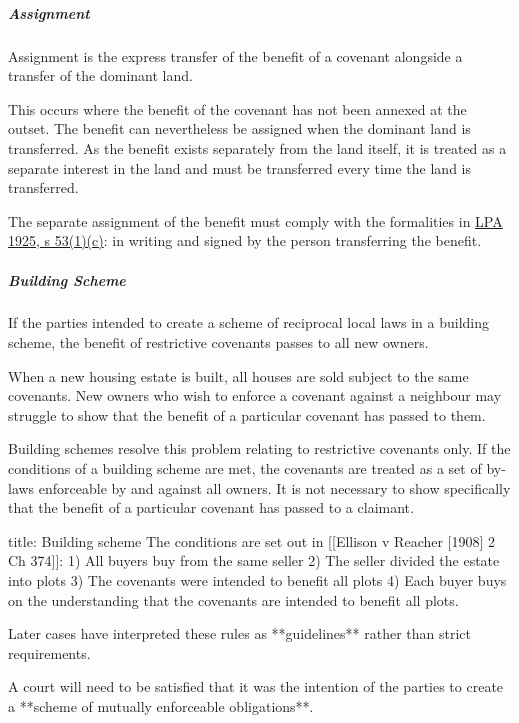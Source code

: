 \documentclass[
]{article}
\newenvironment{Shaded}{}{}
\newcommand{\NormalTok}[1]{#1}
\begin{document}
\hypertarget{assignment}{%
\subparagraph{Assignment}\label{assignment}}

\begin{Shaded}
\begin{Highlighting}[]
\NormalTok{Assignment is the express transfer of the benefit of a covenant alongside a transfer of the dominant land.}
\end{Highlighting}
\end{Shaded}

This occurs where the benefit of the covenant has not been annexed at
the outset. The benefit can nevertheless be assigned when the dominant
land is transferred. As the benefit exists separately from the land
itself, it is treated as a separate interest in the land and must be
transferred every time the land is transferred.

The separate assignment of the benefit must comply with the formalities
in
\href{https://www.legislation.gov.uk/ukpga/Geo5/15-16/20/section/53}{LPA
1925, s 53(1)(c)}: in writing and signed by the person transferring the
benefit.

\hypertarget{building-scheme}{%
\subparagraph{Building Scheme}\label{building-scheme}}

\begin{Shaded}
\begin{Highlighting}[]
\NormalTok{If the parties intended to create a scheme of reciprocal local laws in a building scheme, the benefit of restrictive covenants passes to all new owners.}
\end{Highlighting}
\end{Shaded}

When a new housing estate is built, all houses are sold subject to the
same covenants. New owners who wish to enforce a covenant against a
neighbour may struggle to show that the benefit of a particular covenant
has passed to them.

Building schemes resolve this problem relating to restrictive covenants
only. If the conditions of a building scheme are met, the covenants are
treated as a set of by-laws enforceable by and against all owners. It is
not necessary to show specifically that the benefit of a particular
covenant has passed to a claimant.

\begin{Shaded}
\begin{Highlighting}[]
\NormalTok{title: Building scheme}
\NormalTok{The conditions are set out in [[Ellison v Reacher [1908] 2 Ch 374]]:}
\NormalTok{1) All buyers buy from the same seller}
\NormalTok{2) The seller divided the estate into plots}
\NormalTok{3) The covenants were intended to benefit all plots}
\NormalTok{4) Each buyer buys on the understanding that the covenants are intended to benefit all plots.}

\NormalTok{Later cases have interpreted these rules as **guidelines** rather than strict requirements.}

\NormalTok{A court will need to be satisfied that it was the intention of the parties to create a **scheme of mutually enforceable obligations**.}
\end{Highlighting}
\end{Shaded}
\end{document}
